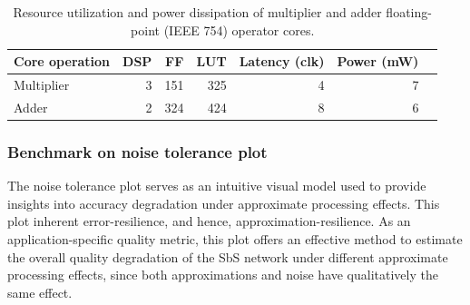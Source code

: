 

\begin{table}[!h]\centering
	\caption{Resource utilization and power dissipation of multiplier and adder floating-point (IEEE 754) operator cores.}\label{tab:LogiCORE}
	\scriptsize
	\begin{tabular}{lrrrrrr}\toprule
		\textbf{Core operation} &\textbf{DSP} &\textbf{FF} &\textbf{LUT} &\textbf{Latency (clk)} &\textbf{Power (mW)} \\\midrule
		Multiplier &3 &151 &325 &4 &7 \\
		Adder &2 &324 &424 &8 &6 \\
		\bottomrule
	\end{tabular}
\end{table}

\subsubsection{Benchmark on noise tolerance plot}
The noise tolerance plot serves as an intuitive visual model used to provide insights into accuracy degradation under approximate processing effects. This plot  inherent error-resilience, and hence, approximation-resilience. As an application-specific quality metric, this plot offers an effective method to estimate the overall quality degradation of the SbS network under different approximate processing effects, since both approximations and noise have qualitatively the same effect\cite{venkataramani2015approximate}.


